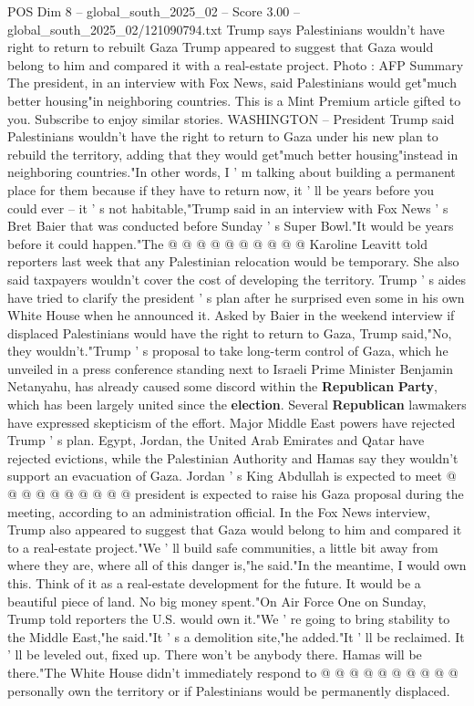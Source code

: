 \begin{textsample}{POS Dim 8 – global\_south\_2025\_02 – Score 3.00 – global\_south\_2025\_02/121090794.txt}  \label{ex:f8_pos_396}
Trump says Palestinians wouldn't have right to return to rebuilt Gaza Trump appeared to suggest that Gaza would belong to him and compared it with a real-estate project.
Photo : AFP Summary The president, in an interview with Fox News, said Palestinians would get"much better housing"in neighboring countries.
This is a Mint Premium article gifted to you.
Subscribe to enjoy similar stories.
WASHINGTON -- President Trump said Palestinians wouldn't have the right to return to Gaza under his new plan to rebuild the territory, adding that they would get"much better housing"instead in neighboring countries."In other words, I ' m talking about building a permanent place for them because if they have to return now, it ' ll be years before you could ever -- it ' s not habitable,"Trump said in an interview with Fox News ' s Bret Baier that was conducted before Sunday ' s Super Bowl."It would be years before it could happen."The @ @ @ @ @ @ @ @ @ @ Karoline Leavitt told reporters last week that any Palestinian relocation would be temporary.
She also said taxpayers wouldn't cover the cost of developing the territory.
Trump ' s aides have tried to clarify the president ' s plan after he surprised even some in his own White House when he announced it.
Asked by Baier in the weekend interview if displaced Palestinians would have the right to return to Gaza, Trump said,"No, they wouldn't."Trump ' s proposal to take long-term control of Gaza, which he unveiled in a press conference standing next to Israeli Prime Minister Benjamin Netanyahu, has already caused some discord within the \textbf{Republican} \textbf{Party}, which has been largely united since the \textbf{election}.
Several \textbf{Republican} lawmakers have expressed skepticism of the effort.
Major Middle East powers have rejected Trump ' s plan.
Egypt, Jordan, the United Arab Emirates and Qatar have rejected evictions, while the Palestinian Authority and Hamas say they wouldn't support an evacuation of Gaza.
Jordan ' s King Abdullah is expected to meet @ @ @ @ @ @ @ @ @ @ president is expected to raise his Gaza proposal during the meeting, according to an administration official.
In the Fox News interview, Trump also appeared to suggest that Gaza would belong to him and compared it to a real-estate project."We ' ll build safe communities, a little bit away from where they are, where all of this danger is,"he said."In the meantime, I would own this.
Think of it as a real-estate development for the future.
It would be a beautiful piece of land.
No big money spent."On Air Force One on Sunday, Trump told reporters the U.S. would own it."We ' re going to bring stability to the Middle East,"he said."It ' s a demolition site,"he added."It ' ll be reclaimed.
It ' ll be leveled out, fixed up.
There won't be anybody there.
Hamas will be there."The White House didn't immediately respond to @ @ @ @ @ @ @ @ @ @ personally own the territory or if Palestinians would be permanently displaced.

\end{textsample}
